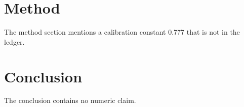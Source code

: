 \documentclass{article}
\begin{document}
\begin{abstract}
This paper describes the experiment.
\end{abstract}
\section{Method}
The method section mentions a calibration constant 0.777 that is not in the ledger.
\section{Conclusion}
The conclusion contains no numeric claim.
\end{document}
